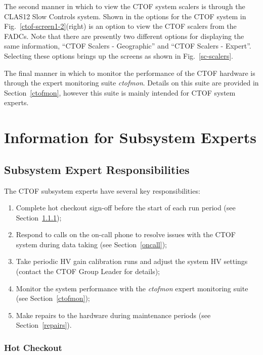 \documentclass[12pt]{article}
\begin{document}
The second manner in which to view the CTOF system scalers is through the CLAS12 Slow Controls system.
Shown in the options for the CTOF system in Fig.~\ref{ctof-screen1-2}(right) is an option to view the CTOF
scalers from the FADCs. Note that there are presently two different options for displaying the same
information, ``CTOF Scalers - Geographic'' and ``CTOF Scalers - Expert''. Selecting these options brings
up the screens as shown in Fig.~\ref{sc-scalers}.

The final manner in which to monitor the performance of the CTOF hardware is through the expert monitoring
suite {\it ctofmon}. Details on this suite are provided in Section~\ref{ctofmon}, however this suite is mainly
intended for CTOF system experts.

\clearpage

\vfil
\eject

\section{Information for Subsystem Experts}

\subsection{Subsystem Expert Responsibilities}

The CTOF subsystem experts have several key responsibilities:

\begin{enumerate}
\item Complete hot checkout sign-off before the start of each run period (see Section~\ref{checkout});
\item Respond to calls on the on-call phone to resolve issues with the CTOF system during data taking (see
Section~\ref{oncall});
\item Take periodic HV gain calibration runs and adjust the system HV settings (contact the CTOF Group
Leader for details);
\item Monitor the system performance with the {\it ctofmon} expert monitoring suite (see
Section~\ref{ctofmon});
\item Make repairs to the hardware during maintenance periods (see Section~\ref{repairs}).
\end{enumerate}

\subsubsection{Hot Checkout}
\label{checkout}
\end{document}
